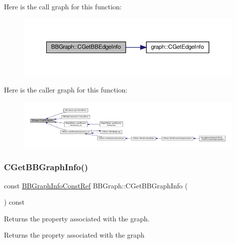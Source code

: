 Here is the call graph for this function\+:
\nopagebreak
\begin{figure}[H]
\begin{center}
\leavevmode
\includegraphics[width=350pt]{dd/d5f/structBBGraph_a2edc519b9c5146df541132a2479e94e3_cgraph}
\end{center}
\end{figure}
Here is the caller graph for this function\+:
\nopagebreak
\begin{figure}[H]
\begin{center}
\leavevmode
\includegraphics[width=350pt]{dd/d5f/structBBGraph_a2edc519b9c5146df541132a2479e94e3_icgraph}
\end{center}
\end{figure}
\mbox{\label{structBBGraph_a3cd121592236889c951a9d35d39471e4}} 
\subsubsection{\texorpdfstring{C\+Get\+B\+B\+Graph\+Info()}{CGetBBGraphInfo()}}
{\footnotesize\ttfamily const \hyperlink{basic__block_8hpp_a36fb0dc395f0395a8a09dca03b034e78}{B\+B\+Graph\+Info\+Const\+Ref} B\+B\+Graph\+::\+C\+Get\+B\+B\+Graph\+Info (\begin{DoxyParamCaption}{ }\end{DoxyParamCaption}) const\hspace{0.3cm}{\ttfamily [inline]}}



Returns the property associated with the graph. 

\begin{DoxyReturn}{Returns}
the proprty associated with the graph 
\end{DoxyReturn}


